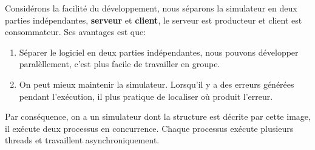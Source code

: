 \documentclass[14px]{article}
\begin{document}
Considérons la facilité du développement, nous séparons la simulateur en deux parties indépendantes, \textbf{serveur} et \textbf{client}, le serveur est producteur et client est consommateur. Ses avantages est que:
\begin{enumerate}
	\item Séparer le logiciel en deux parties indépendantes, nous pouvons développer paralèllement, c'est plus facile de travailler en groupe.
	\item On peut mieux maintenir la simulateur. Lorsqu'il y a des erreurs générées pendant l'exécution, il plus pratique de localiser où produit l'erreur.
\end{enumerate}

Par conséquence, on a un simulateur dont la structure est décrite par cette image, il exécute deux processus en concurrence. Chaque processus exécute plusieurs threads et travaillent asynchroniquement.

\begin{figure}[htbp]
\end{figure}
\end{document}
